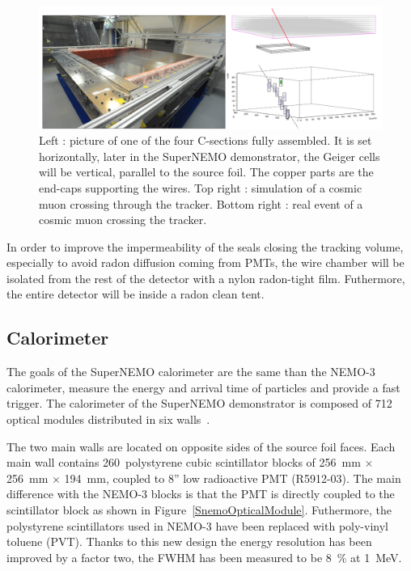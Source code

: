 \documentclass[main.tex]{subfiles}
\begin{document}
\begin{figure}[h!]
\begin{center}
\includegraphics[scale=0.25]{pictures/Chap3/TrackerTestCosmic.png}
\caption{Left : picture of one of the four C-sections fully assembled. It is set horizontally, later in the SuperNEMO demonstrator, the Geiger cells will be vertical, parallel to the source foil. The copper parts are the end-caps supporting the wires. Top right : simulation of a cosmic muon crossing through the tracker. Bottom right : real event of a cosmic muon crossing the tracker.}
\label{SnemoTracker}
\end{center}
\end{figure}


\NI In order to improve the impermeability of the seals closing the tracking volume, especially to avoid radon diffusion coming from PMTs, the wire chamber will be isolated from the rest of the detector with a nylon radon-tight film. Futhermore, the entire detector will be inside a radon clean tent.


\FloatBarrier


\subsection{Calorimeter}


\NI The goals of the SuperNEMO calorimeter are the same than the NEMO-3 calorimeter, measure the energy and arrival time of particles and provide a fast trigger. The calorimeter of the SuperNEMO demonstrator is composed of 712 optical modules distributed in six walls~\cite{SNCalorimeter}.


\bigskip


\NI The two main walls are located on opposite sides of the source foil faces. Each main wall contains 260~polystyrene cubic scintillator blocks of 256~mm $\times$ 256~mm $\times$ 194~mm, coupled to 8'' low radioactive PMT (R5912-03). The main difference with the NEMO-3 blocks is that the PMT is directly coupled to the scintillator block as shown in Figure~\ref{SnemoOpticalModule}. Futhermore, the polystyrene scintillators used in NEMO-3 have been replaced with poly-vinyl toluene (PVT). Thanks to this new design the energy resolution has been improved by a factor two, the FWHM has been measured to be 8~\% at 1~MeV.
\end{document}
